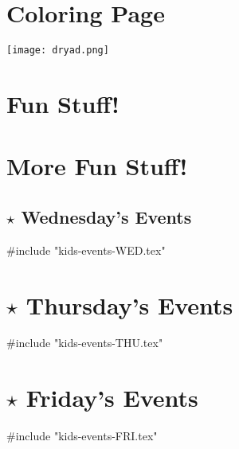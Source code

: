 \documentclass[9pt,twoside,openright,final,article,letterpaper]{memoir}
\let\oldsection=\section
\renewcommand{\section}[1]{%
  \nopagebreak
  \vspace{6pt} %
  \needspace{1.5in}
  \oldsection{#1}
  \nopagebreak}
\begin{document}
\newpage

\section{Coloring Page}

\vfill
{\centering\texttt{[image: dryad.png]}}
\vfill

\newpage

\section{Fun Stuff!}

\vfill

\newpage

\section{More Fun Stuff!}

\vfill

\newpage





\begin{multicols}{3}
  \section{{\Large $\star$} Wednesday's Events}

  #include "kids-events-WED.tex"
\end{multicols}

{ \hline }

\section{{\Large $\star$} Thursday's Events}
\begin{multicols}{3}
  #include "kids-events-THU.tex"
\end{multicols}

{ \hline }

\section{{\Large $\star$} Friday's Events}
\begin{multicols}{3}
  #include "kids-events-FRI.tex"
\end{multicols}
\end{document}
